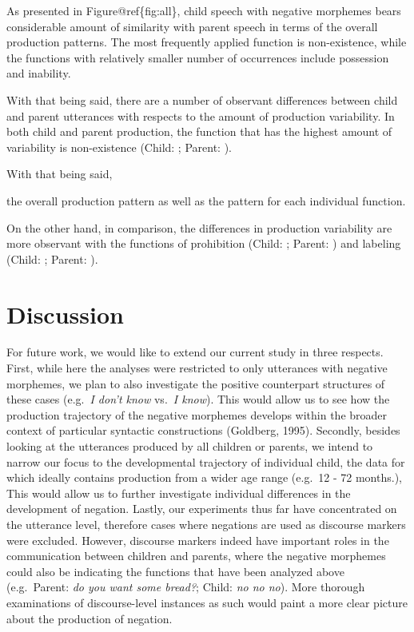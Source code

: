 \documentclass[10pt, letterpaper]{article}
\begin{document}
As presented in Figure@ref\{fig:all\}, child speech with negative
morphemes bears considerable amount of similarity with parent speech in
terms of the overall production patterns. The most frequently applied
function is non-existence, while the functions with relatively smaller
number of occurrences include possession and inability.

With that being said, there are a number of observant differences
between child and parent utterances with respects to the amount of
production variability. In both child and parent production, the
function that has the highest amount of variability is non-existence
(Child: ; Parent: ).

With that being said,

the overall production pattern as well as the pattern for each
individual function.

On the other hand, in comparison, the differences in production
variability are more observant with the functions of prohibition (Child:
; Parent: ) and labeling (Child: ; Parent: ).

\hypertarget{discussion}{%
\section{Discussion}\label{discussion}}

For future work, we would like to extend our current study in three
respects. First, while here the analyses were restricted to only
utterances with negative morphemes, we plan to also investigate the
positive counterpart structures of these cases (e.g.~\emph{I don't know}
vs.~\emph{I know}). This would allow us to see how the production
trajectory of the negative morphemes develops within the broader context
of particular syntactic constructions (Goldberg, 1995). Secondly,
besides looking at the utterances produced by all children or parents,
we intend to narrow our focus to the developmental trajectory of
individual child, the data for which ideally contains production from a
wider age range (e.g.~12 - 72 months.), This would allow us to further
investigate individual differences in the development of negation.
Lastly, our experiments thus far have concentrated on the utterance
level, therefore cases where negations are used as discourse markers
were excluded. However, discourse markers indeed have important roles in
the communication between children and parents, where the negative
morphemes could also be indicating the functions that have been analyzed
above (e.g.~Parent: \emph{do you want some bread?}; Child: \emph{no no
no}). More thorough examinations of discourse-level instances as such
would paint a more clear picture about the production of negation.
\end{document}

